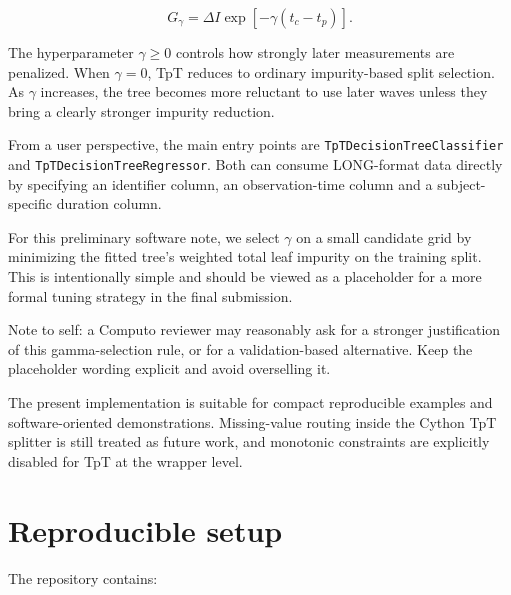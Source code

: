 \documentclass[
  letterpaper,
  DIV=11,
  numbers=noendperiod]{scrartcl}
\begin{document}
\[
G_{\gamma} = \Delta I \exp \left[-\gamma (t_c - t_p)\right].
\]

The hyperparameter \(\gamma \ge 0\) controls how strongly later
measurements are penalized. When \(\gamma = 0\), TpT reduces to ordinary
impurity-based split selection. As \(\gamma\) increases, the tree
becomes more reluctant to use later waves unless they bring a clearly
stronger impurity reduction.

From a user perspective, the main entry points are
\texttt{TpTDecisionTreeClassifier} and
\texttt{TpTDecisionTreeRegressor}. Both can consume LONG-format data
directly by specifying an identifier column, an observation-time column
and a subject-specific duration column.

For this preliminary software note, we select \(\gamma\) on a small
candidate grid by minimizing the fitted tree's weighted total leaf
impurity on the training split. This is intentionally simple and should
be viewed as a placeholder for a more formal tuning strategy in the
final submission.

{Note to self: a Computo reviewer may reasonably ask for a stronger
justification of this gamma-selection rule, or for a validation-based
alternative. Keep the placeholder wording explicit and avoid overselling
it.}

\begin{tcolorbox}[enhanced jigsaw, titlerule=0mm, bottomrule=.15mm, toptitle=1mm, toprule=.15mm, leftrule=.75mm, title=\textcolor{quarto-callout-note-color}{\faInfo}\hspace{0.5em}{Current scope}, colback=white, colframe=quarto-callout-note-color-frame, colbacktitle=quarto-callout-note-color!10!white, left=2mm, opacityback=0, breakable, bottomtitle=1mm, arc=.35mm, coltitle=black, opacitybacktitle=0.6, rightrule=.15mm]

The present implementation is suitable for compact reproducible examples
and software-oriented demonstrations. Missing-value routing inside the
Cython TpT splitter is still treated as future work, and monotonic
constraints are explicitly disabled for TpT at the wrapper level.

\end{tcolorbox}

\section{Reproducible setup}\label{reproducible-setup}

The repository contains:
\end{document}
